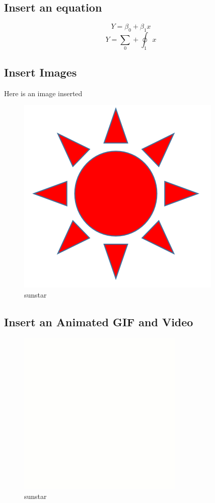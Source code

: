 \documentclass[
]{article}
\begin{document}
\hypertarget{insert-an-equation}{%
\subsection{Insert an equation}\label{insert-an-equation}}

\[ Y = \beta_0 + \beta_1x \] \[ Y = \sum_0 + \oint_1x \]

\hypertarget{insert-images}{%
\subsection{Insert Images}\label{insert-images}}

Here is an image inserted

\begin{figure}
\centering
\includegraphics{sunstar.png}
\caption{sunstar}
\end{figure}

\hypertarget{insert-an-animated-gif-and-video}{%
\subsection{Insert an Animated GIF and
Video}\label{insert-an-animated-gif-and-video}}

\begin{figure}
\centering
\includegraphics{sunstar.gif}
\caption{sunstar}
\end{figure}
\end{document}

